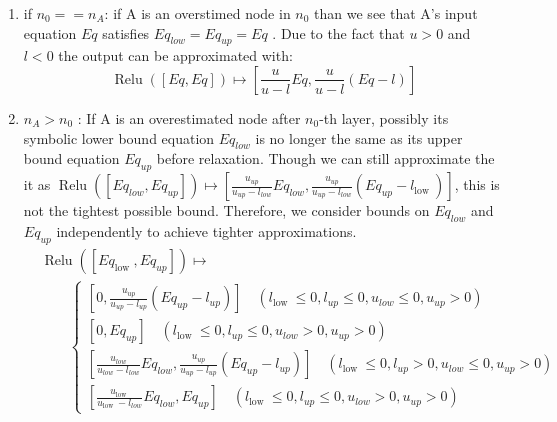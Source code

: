 \begin{enumerate}
        \item if $n_0 == n_A$: if A is an overstimed node in $n_0$ than we see that A's input equation $Eq$ satisfies $Eq_{low} = Eq_{up}=Eq$ .  Due to the fact that $u>0$ and $l<0$ the output can be approximated with:
        \begin{equation}
       	 \operatorname{Relu}([E q, E q]) \mapsto\left[\frac{u}{u-l} E q, \frac{u}{u-l}(E q-l)\right]
        \end{equation}
        
        \item $n_A>n_0$ : If $\mathrm{A}$ is an overestimated node after $n_0$-th layer, 
    	possibly its symbolic lower bound equation $E q_{l o w}$ is no longer the same as its upper bound equation $E q_{u p}$ before relaxation.
     	Though we can still approximate the it as $\operatorname{Relu}\left(\left[E q_{l o w}, E q_{u p}\right]\right) \mapsto\left[\frac{u_{u p}}{u_{u p}-l_{l o w}} E q_{l o w}, \frac{u_{u p}}{u_{u p}-l_{l o w}}\left(E q_{u p}-l_{\text {low }}\right)\right]$, this is not 		 	the tightest 	possible bound. Therefore, we consider bounds on $E q_{l o w}$ and $E q_{u p}$ independently to achieve tighter approximations.
	\begin{equation}
    		\begin{aligned}
    			& \operatorname{Relu}\left(\left[E q_{\text {low }}, E q_{u p}\right]\right) \mapsto \\
    			& \qquad\left\{\begin{array}{l}
    				{\left[0, \frac{u_{u p}}{u_{u p}-l_{u p}}\left(E q_{u p}-l_{u p}\right)\right] \quad\left(l_{\text {low }} \leq 0, l_{u p} \leq 0, u_{l o w} \leq 0, u_{u p}>0\right)} \\
    				{\left[0, E q_{u p}\right] \quad\left(l_{\text {low }} \leq 0, l_{u p} \leq 0, u_{l o w}>0, u_{u p}>0\right)} \\
    				{\left[\frac{u_{l o w}}{u_{l o w}-l_{l o w}} E q_{l o w}, \frac{u_{u p}}{u_{u p}-l_{u p}}\left(E q_{u p}-l_{u p}\right)\right] \quad\left(l_{\text {low }} \leq 0, l_{u p}>0, u_{l o w} \leq 0, u_{u p}>0\right)} \\
    				{\left[\frac{u_{\text {low }}}{u_{\text {low }}-l_{l o w}} E q_{l o w}, E q_{u p}\right] \quad\left(l_{\text {low }} \leq 0, l_{u p} \leq 0, u_{l o w}>0, u_{u p}>0\right)}
   			\end{array}\right.
   		\end{aligned}
%    	
	\end{equation}
 \end{enumerate}
    